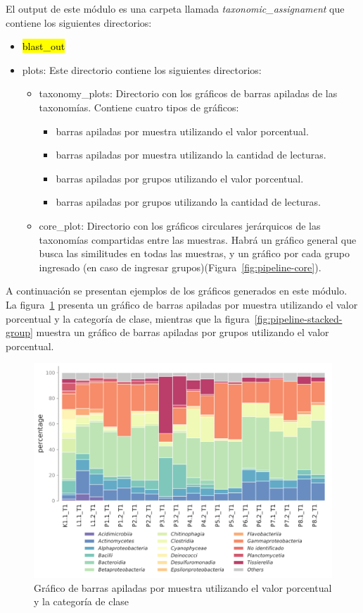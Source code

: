 El output de este módulo es una carpeta llamada \textit{taxonomic\_assignament} que contiene los siguientes directorios:
\begin{itemize}
\item \hl{blast\_out}
\item plots: Este directorio contiene los siguientes directorios:
\begin{itemize}
    \item taxonomy\_plots: Directorio con los gráficos de barras apiladas de las taxonomías. Contiene cuatro tipos de gráficos: 
    \begin{itemize}
        \item barras apiladas por muestra utilizando el valor porcentual.
        \item barras apiladas por muestra utilizando la cantidad de lecturas.
        \item barras apiladas por grupos utilizando el valor porcentual.
        \item barras apiladas por grupos utilizando la cantidad de lecturas.
    \end{itemize}
    \item core\_plot: Directorio con los gráficos circulares jerárquicos de las taxonomías compartidas entre las muestras. Habrá un gráfico general que busca las similitudes en todas las muestras, y un gráfico por cada grupo ingresado (en caso de ingresar grupos)(Figura~\ref{fig:pipeline-core}).
\end{itemize}
 \end{itemize}
A continuación se presentan ejemplos de los gráficos generados en este módulo. La figura~\ref{fig:pipeline-stacked-sample} presenta un gráfico de barras apiladas por muestra utilizando el valor porcentual y la categoría de clase, mientras que la figura~\ref{fig:pipeline-stacked-group} muestra un gráfico de barras apiladas por grupos utilizando el valor porcentual.
\begin{figure}[H]
    \centering
    \includegraphics[width=1\linewidth,height=0.4\textheight]{images/pipeline/class_samples_percentage.pdf}
    \caption{Gráfico de barras apiladas por muestra utilizando el valor porcentual y la categoría de clase}
    \label{fig:pipeline-stacked-sample}
\end{figure}
